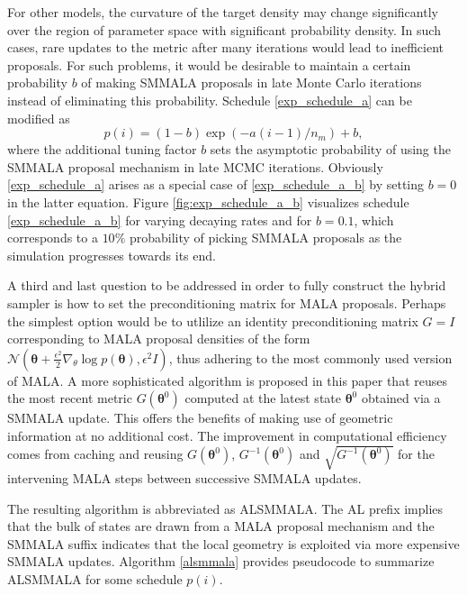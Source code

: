 \documentclass[twoside,11pt]{article}
\begin{document}
For other models, the curvature of the target density may change significantly over the region of parameter space with 
significant probability density. In such cases, rare updates to the metric after many iterations would lead to inefficient 
proposals. For such problems, it would be desirable to maintain a certain probability $b$ of making SMMALA proposals in late 
Monte Carlo iterations instead of eliminating this probability. Schedule \eqref{exp_schedule_a} can be modified as
\begin{equation}
\label{exp_schedule_a_b}
p(i)=(1-b)\exp{(-a(i-1)/n_m)}+b,
\end{equation}
where the additional tuning factor $b$ sets the asymptotic probability of using the SMMALA proposal mechanism in late MCMC
iterations. Obviously \eqref{exp_schedule_a} arises as a special case of \eqref{exp_schedule_a_b} by setting $b=0$ in the 
latter equation. Figure \ref{fig:exp_schedule_a_b} visualizes schedule \eqref{exp_schedule_a_b} for varying decaying rates 
and for $b=0.1$, which corresponds to a $10\%$ probability of picking SMMALA proposals as the simulation progresses towards 
its end.

A third and last question to be addressed in order to fully construct the hybrid sampler is how to set the preconditioning 
matrix for MALA proposals. Perhaps the simplest option would be to utlilize an identity preconditioning matrix $G=I$ 
corresponding to MALA proposal densities of the form
$\mathcal{N}(\boldsymbol{\theta}+\frac{\epsilon^2}{2}\nabla_{\theta}\log{p(\boldsymbol{\theta})}, \epsilon^2 I)$,
thus adhering to the most commonly used version of MALA. A more sophisticated algorithm is proposed in this paper that 
reuses the most recent metric $G(\boldsymbol{\theta}^0)$ computed at the latest state $\boldsymbol{\theta}^0$ obtained via a 
SMMALA update. This offers the benefits of making use of geometric information at no additional cost. The improvement in 
computational efficiency comes from caching and reusing $G(\boldsymbol{\theta}^0)$, $G^{-1}(\boldsymbol{\theta}^0)$ and 
$\sqrt{G^{-1}(\boldsymbol{\theta}^0)}$ for the intervening MALA steps between successive SMMALA updates. 

The resulting algorithm is abbreviated as ALSMMALA. The AL prefix implies that the bulk of states are drawn from a MALA 
proposal mechanism and the SMMALA suffix indicates that the local geometry is exploited via more expensive SMMALA updates.
Algorithm \ref{alsmmala} provides pseudocode to summarize ALSMMALA for some schedule $p(i)$.
\end{document}
